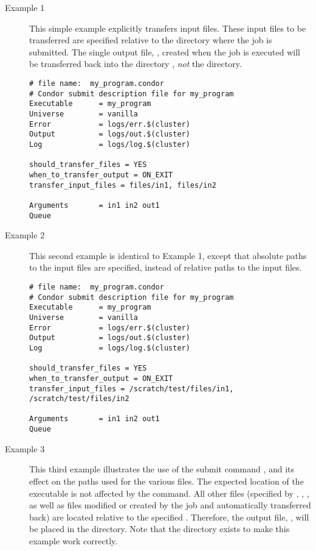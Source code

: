 \begin{description}
\item[Example 1]

This simple example explicitly transfers input files.
These input files to be transferred
are specified relative to the directory where the job is submitted.
The single output file, , created when the job is executed
will be transferred back into the directory
, \emph{not} the  directory. 

\footnotesize
\begin{verbatim}
# file name:  my_program.condor
# Condor submit description file for my_program
Executable      = my_program
Universe        = vanilla
Error           = logs/err.$(cluster)
Output          = logs/out.$(cluster)
Log             = logs/log.$(cluster)

should_transfer_files = YES
when_to_transfer_output = ON_EXIT
transfer_input_files = files/in1, files/in2

Arguments       = in1 in2 out1
Queue
\end{verbatim}
\normalsize

\item[Example 2]

This second example is identical to Example 1,
except that absolute paths to the input files are specified,
instead of relative paths to the input files.

\footnotesize
\begin{verbatim}
# file name:  my_program.condor
# Condor submit description file for my_program
Executable      = my_program
Universe        = vanilla
Error           = logs/err.$(cluster)
Output          = logs/out.$(cluster)
Log             = logs/log.$(cluster)

should_transfer_files = YES
when_to_transfer_output = ON_EXIT
transfer_input_files = /scratch/test/files/in1, /scratch/test/files/in2

Arguments       = in1 in2 out1
Queue
\end{verbatim}
\normalsize

\item[Example 3]

This third example illustrates the use of the 
submit command , and its effect
on the paths used for the various files.
The expected location of the 
executable is not affected by the 
 command.
All other files
(specified by ,
,
,
as well as files modified or created by the job
and automatically transferred back)
are located relative to the specified .
Therefore, the output file, ,
will be placed in the \verb@files@ directory.
Note that the  directory
exists to make this example work correctly.


\end{description}
